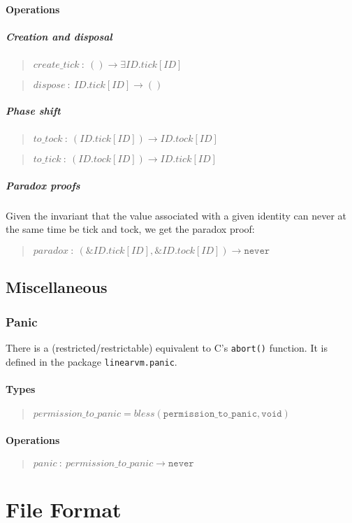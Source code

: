 \documentclass[a4paper]{book}
\newcommand\TypeDefinition[1]{\begin{quote}$\mathit{#1}$\end{quote}}
\newcommand\FuncSignature[2]{\begin{quote}$\mathit{#1}\ :\ \mathit{#2}$\end{quote}}
\begin{document}
\subsection*{Operations}
\subsubsection*{Creation and disposal}
\FuncSignature{create\_tick}{() \to \exists ID.tick[ID]}
\FuncSignature{dispose}{ID.tick[ID] \to ()}

\subsubsection*{Phase shift}
\FuncSignature{to\_tock}{(ID.tick[ID]) \to ID.tock[ID]}
\FuncSignature{to\_tick}{(ID.tock[ID]) \to ID.tick[ID]}

\subsubsection*{Paradox proofs}
Given the invariant that the value associated with a given identity
can never at the same time be tick and tock, we get the paradox proof:
\FuncSignature{paradox}{(\&ID.tick[ID], \&ID.tock[ID]) \to \texttt{never}}

\chapter{Miscellaneous}

\section{Panic}

There is a (restricted/restrictable) equivalent to C's \texttt{abort()} function.
It is defined in the package \texttt{linearvm.panic}.

\subsection*{Types}
\TypeDefinition{permission\_to\_panic = bless(\texttt{permission\_to\_panic}, \texttt{void})}

\subsection*{Operations}
\FuncSignature{panic}{permission\_to\_panic \to \texttt{never}}


\part{File Format}
\end{document}
